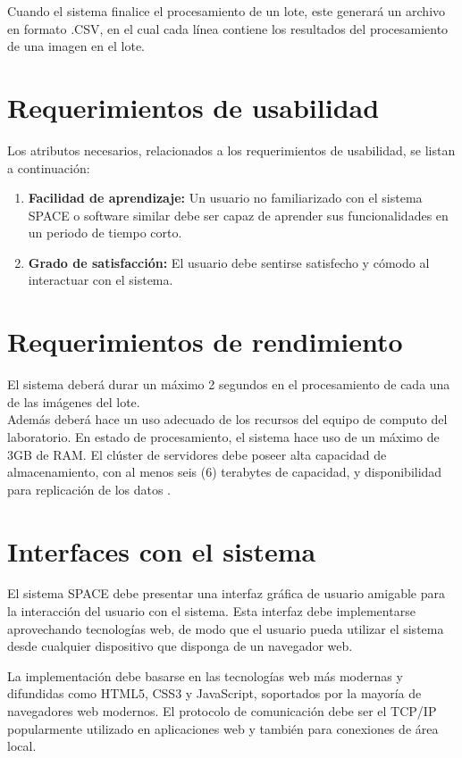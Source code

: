 \documentclass{scrreprt}
\begin{document}
Cuando el sistema finalice el procesamiento de un lote, este generará un archivo en formato .CSV, en el cual cada línea contiene los resultados del procesamiento de una imagen en el lote.\\

\section{Requerimientos de usabilidad}
Los atributos necesarios, relacionados a los requerimientos de usabilidad, se listan a continuación:

\begin{enumerate}[label=\alph*.]
\item  \textbf{Facilidad de aprendizaje:} Un usuario no familiarizado con el sistema SPACE o software similar debe ser capaz de aprender sus funcionalidades en un periodo de tiempo corto.
\item  \textbf{Grado de satisfacción:} El usuario debe sentirse satisfecho y cómodo al interactuar con el sistema.
\end{enumerate}

\section{Requerimientos de rendimiento}

El sistema deberá durar un máximo 2 segundos en el procesamiento de cada una de las imágenes del lote.\\

Además deberá hace un uso adecuado de los recursos del equipo de computo del laboratorio. En estado de procesamiento, el sistema hace uso de un máximo de 3GB de RAM. El clúster de servidores debe poseer alta capacidad de almacenamiento, con al menos seis (6) terabytes de capacidad, y disponibilidad para replicación de los datos .\\

\section{Interfaces con el sistema}

El sistema SPACE debe presentar una interfaz gráfica de usuario amigable para la interacción del usuario con el sistema. Esta interfaz debe implementarse aprovechando tecnologías web, de modo que el usuario pueda utilizar el sistema desde cualquier dispositivo que disponga de un navegador web.

La implementación debe basarse en las tecnologías web más modernas y difundidas como HTML5, CSS3 y JavaScript, soportados por la mayoría de navegadores web modernos. El protocolo de comunicación debe ser el TCP/IP popularmente utilizado en aplicaciones web y también para conexiones de área local.\\
\end{document}
